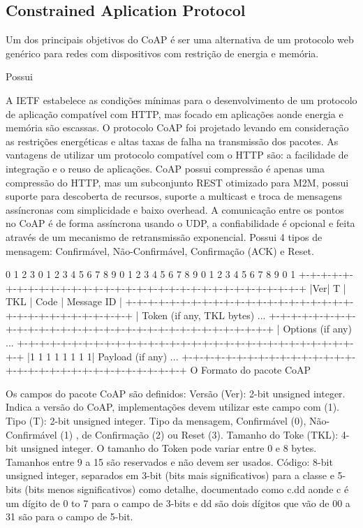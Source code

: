 \subsection{Constrained Aplication Protocol}

Um dos principais objetivos do CoAP \'e ser uma alternativa de um protocolo web gen\'erico para redes com dispositivos com restrição de energia e mem\'oria.

Possui 

A IETF estabelece as condiç\~oes m\'inimas para o desenvolvimento de um protocolo de aplicação compat\'ivel com HTTP, mas focado em aplicaç\~oes aonde energia e mem\'oria são escassas. O protocolo CoAP foi projetado levando em consideração as restriç\~oes energ\'eticas e altas taxas de falha na transmissão dos pacotes. As vantagens de utilizar um protocolo compat\'ivel com o HTTP são: a facilidade de integração e o reuso de aplicaç\~oes. CoAP possui compressão \'e apenas uma compressão do HTTP, mas um subconjunto REST otimizado para M2M, possui suporte para descoberta de recursos, suporte a multicast e troca de mensagens ass\'incronas com simplicidade e baixo overhead. A comunicação entre os pontos no CoAP \'e de forma ass\'incrona usando o UDP, a confiabilidade \'e opcional e feita atrav\'es de um mecanismo de retransmissão exponencial. Possui 4 tipos de mensagem: Confirm\'avel, Não-Confirm\'avel, Confirmação (ACK) e Reset.


     0                   1                   2                   3
    0 1 2 3 4 5 6 7 8 9 0 1 2 3 4 5 6 7 8 9 0 1 2 3 4 5 6 7 8 9 0 1
   +-+-+-+-+-+-+-+-+-+-+-+-+-+-+-+-+-+-+-+-+-+-+-+-+-+-+-+-+-+-+-+-+
   |Ver| T |  TKL  |      Code     |          Message ID           |
   +-+-+-+-+-+-+-+-+-+-+-+-+-+-+-+-+-+-+-+-+-+-+-+-+-+-+-+-+-+-+-+-+
   |   Token (if any, TKL bytes) ...
   +-+-+-+-+-+-+-+-+-+-+-+-+-+-+-+-+-+-+-+-+-+-+-+-+-+-+-+-+-+-+-+-+
   |   Options (if any) ...
   +-+-+-+-+-+-+-+-+-+-+-+-+-+-+-+-+-+-+-+-+-+-+-+-+-+-+-+-+-+-+-+-+
   |1 1 1 1 1 1 1 1|    Payload (if any) ...
   +-+-+-+-+-+-+-+-+-+-+-+-+-+-+-+-+-+-+-+-+-+-+-+-+-+-+-+-+-+-+-+-+
   O Formato do pacote CoAP  \cite{draft-ietf-core-coap-18}


Os campos do pacote CoAP são definidos:
   Versão (Ver):  2-bit unsigned integer.  Indica a versão do CoAP, implementaç\~oes devem utilizar este campo com (1).
   Tipo (T):  2-bit unsigned integer. Tipo da mensagem, Confirm\'avel (0), Não-Confirm\'avel (1) , de Confirmação (2) ou Reset (3).
   Tamanho do Toke (TKL):  4-bit unsigned integer. O tamanho do Token pode variar entre 0 e 8 bytes. Tamanhos entre 9 a 15 são reservados e não devem ser usados.
   C\'odigo:  8-bit unsigned integer, separados em 3-bit (bits mais significativos) para a classe e 5-bits (bits menos significativos) como detalhe, documentado como c.dd aonde c \'e um d\'igito de 0 to 7 para o campo de 3-bits e dd são dois d\'igitos que vão de 00 a 31 são para o campo de 5-bit.
   
